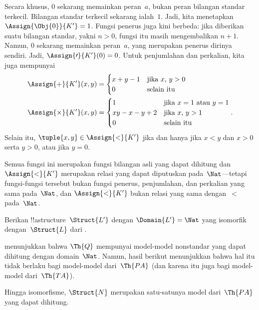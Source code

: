 \documentclass[../../../include/open-logic-section]{subfiles}
\begin{document}
\begin{ex}
Secara khusus, $0$ sekarang memainkan peran~$a$, bukan peran bilangan standar
terkecil. Bilangan standar terkecil sekarang ialah~$1$. Jadi, kita menetapkan
$\Assign{\Obj{0}}{K'} = 1$. Fungsi penerus juga kini berbeda: jika diberikan
suatu bilangan standar, yakni $n > 0$, fungsi itu masih mengembalikan $n+1$.
Namun, $0$ sekarang memainkan peran~$a$, yang merupakan penerus dirinya
sendiri. Jadi, $\Assign{\prime}{K'}(0) = 0$. Untuk penjumlahan dan perkalian,
kita juga mempunyai
\begin{align*}
\Assign{+}{K'}(x, y) & =
  \begin{cases}
    x+y-1 & \text{jika $x$, $y >0$}\\
    0 & \text{selain itu}
  \end{cases}\\
  \Assign{\times}{K'}(x, y) & =
  \begin{cases}
    1 & \text{jika $x = 1$ atau $y = 1$}\\
    xy - x - y + 2 & \text{jika $x$, $y > 1$}\\
    0 & \text{selain itu}\\
  \end{cases}.
\end{align*}
Selain itu, $\tuple{x, y} \in \Assign{<}{K'}$ jika dan hanya jika
$x < y$ dan $x > 0$ serta $y > 0$, atau jika $y = 0$.

Semua fungsi ini merupakan fungsi bilangan asli yang dapat dihitung dan
$\Assign{<}{K'}$ merupakan relasi yang dapat diputuskan pada~$\Nat$---tetapi
fungsi-fungsi tersebut bukan fungsi penerus, penjumlahan, dan perkalian yang
sama pada~$\Nat$, dan $\Assign{<}{K'}$ bukan relasi yang sama dengan~$<$
pada~$\Nat$.
\end{ex}

\begin{prob}
Berikan !!a{structure}~$\Struct{L'}$ dengan $\Domain{L'} = \Nat$ yang
isomorfik dengan~$\Struct{L}$ dari
.
\end{prob}

\begin{explain}
 menunjukkan bahwa $\Th{Q}$ mempunyai model-model
nonstandar yang dapat dihitung dengan domain~$\Nat$. Namun, hasil berikut
menunjukkan bahwa hal itu tidak berlaku bagi model-model dari~$\Th{PA}$ (dan
karena itu juga bagi model-model dari~$\Th{TA}$).
\end{explain}

\begin{thm}
Hingga isomorfisme, $\Struct{N}$ merupakan satu-satunya model dari~$\Th{PA}$
yang dapat dihitung.
\end{thm}
\end{document}
